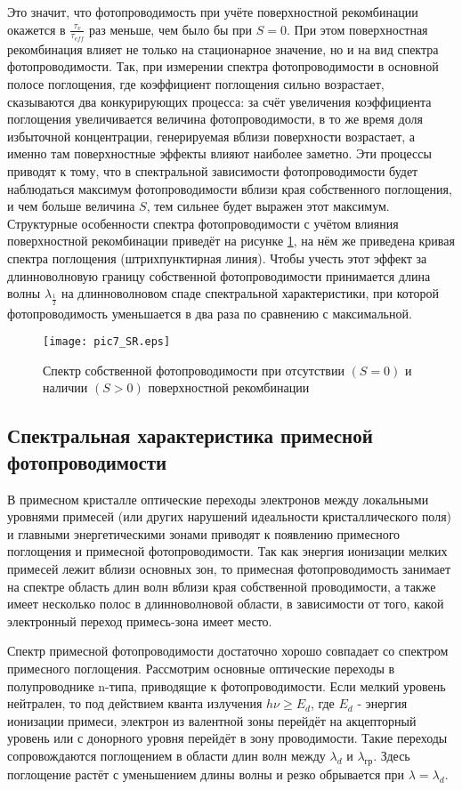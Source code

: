 Это значит, что фотопроводимость при учёте поверхностной рекомбинации окажется в $\frac{\tau_{v}}{\tau_{eff}}$ раз меньше, чем было бы при $S = 0$. При этом поверхностная рекомбинация влияет не только на стационарное значение, но и на вид спектра фотопроводимости. Так, при измерении спектра фотопроводимости в основной полосе поглощения, где коэффициент поглощения сильно возрастает, сказываются два конкурирующих процесса: за счёт увеличения коэффициента поглощения увеличивается величина фотопроводимости, в то же время доля избыточной концентрации, генерируемая вблизи поверхности возрастает, а именно там поверхностные эффекты влияют наиболее заметно. Эти процессы приводят к тому, что в спектральной зависимости фотопроводимости будет наблюдаться максимум фотопроводимости вблизи края собственного поглощения, и чем больше величина $S$, тем сильнее будет выражен этот максимум. Структурные особенности спектра фотопроводимости с учётом влияния поверхностной рекомбинации приведёт на рисунке \ref{pic7_SR}, на нём же приведена кривая спектра поглощения (штрихпунктирная линия). Чтобы учесть этот эффект за длинноволновую границу собственной фотопроводимости принимается длина волны $\lambda_{\frac{1}{2}}$ на длинноволновом спаде спектральной характеристики, при которой фотопроводимость уменьшается в два раза по сравнению с максимальной.

\begin{figure}[h!]\centering
\texttt{[image: pic7\_SR.eps]}
\caption{Спектр собственной фотопроводимости при отсутствии $(S = 0)$ и наличии $(S > 0)$ поверхностной рекомбинации}
\label{pic7_SR}
\end{figure}

\subsection{Спектральная характеристика примесной фотопроводимости}
В примесном кристалле оптические переходы электронов между локальными уровнями примесей (или других нарушений идеальности кристаллического поля) и главными энергетическими зонами приводят к появлению примесного поглощения и примесной фотопроводимости. Так как энергия ионизации мелких примесей лежит вблизи основных зон, то примесная фотопроводимость занимает на спектре область длин волн вблизи края собственной проводимости, а также имеет несколько полос в длинноволновой области, в зависимости от того, какой электронный переход примесь-зона имеет место.

Спектр примесной фотопроводимости достаточно хорошо совпадает со спектром примесного поглощения. Рассмотрим основные оптические переходы в полупроводнике n-типа, приводящие к фотопроводимости. Если мелкий уровень нейтрален, то под действием кванта излучения $h \nu \ge E_{d}$, где $E_{d}$  - энергия ионизации примеси, электрон из валентной зоны перейдёт на акцепторный уровень или с донорного уровня перейдёт в зону проводимости. Такие переходы сопровождаются поглощением в области длин волн между $\lambda_{d}$ и $\lambda_{\text{гр}}$. Здесь поглощение растёт с уменьшением длины волны и резко обрывается при $\lambda = \lambda_{d}$.

